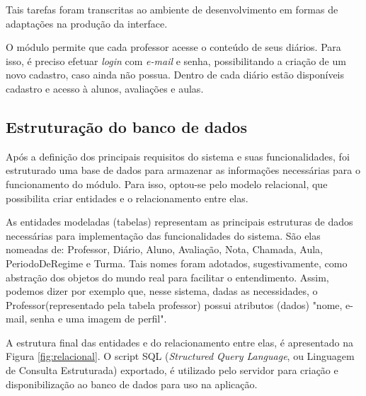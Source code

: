 Tais tarefas foram transcritas ao ambiente de desenvolvimento em formas de adaptações na produção da interface. 

O módulo permite que cada professor acesse o conteúdo de seus diários. Para isso, é preciso efetuar \textit{login} com \textit{e-mail} e senha, possibilitando a criação de um novo cadastro, caso ainda não possua. Dentro de cada diário estão disponíveis cadastro e acesso à alunos, avaliações e aulas. 



\subsection{Estruturação do banco de dados}

Após a definição dos principais requisitos do sistema e suas funcionalidades, foi estruturado uma base de dados para armazenar as informações necessárias para o funcionamento do módulo. Para isso, optou-se pelo modelo relacional, que possibilita criar entidades e o relacionamento entre elas.

As entidades modeladas (tabelas) representam as principais estruturas de dados necessárias para implementação das funcionalidades do sistema. São elas nomeadas de: Professor, Diário, Aluno, Avaliação, Nota, Chamada, Aula, PeriodoDeRegime e Turma. Tais nomes foram adotados,  sugestivamente, como abstração dos objetos do mundo real para facilitar o entendimento. Assim, podemos dizer por exemplo que, nesse sistema, dadas as necessidades, o Professor(representado pela tabela professor) possui atributos (dados) "nome, e-mail, senha e uma imagem de perfil".

A estrutura final das entidades e do relacionamento entre elas, é apresentado na Figura \ref{fig:relacional}. O script SQL (\textit{Structured Query Language}, ou Linguagem de Consulta Estruturada) exportado, é utilizado pelo servidor para criação e disponibilização ao banco de dados para uso na aplicação.  

